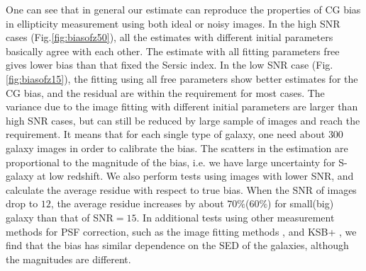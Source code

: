 \documentclass[useAMS,usenatbib]{mn2e}
\begin{document}
One can see that in general our estimate can reproduce the properties
of CG bias in ellipticity measurement using both ideal or noisy
images.  In the high SNR cases (Fig.\ref{fig:biasofz50}), all the
estimates with different initial parameters basically agree with each
other. The estimate with all fitting parameters free gives lower bias
than that fixed the Sersic index. In the low SNR case
(Fig.\ref{fig:biasofz15}), the fitting using all free parameters show
better estimates for the CG bias, and the residual are within the
requirement for most cases. The variance due to the image fitting with
different initial parameters are larger than high SNR cases, but can
still be reduced by large sample of images and reach the requirement.
It means that for each single type of galaxy, one need about $300$
galaxy images in order to calibrate the bias. The scatters in the
estimation are proportional to the magnitude of the bias, i.e. we have
large uncertainty for S-galaxy at low redshift. We also perform tests
using images with lower SNR, and calculate the average residue with
respect to true bias. When the SNR of images drop to $12$, the average
residue increases by about $70\%$($60\%$) for small(big) galaxy than
that of SNR$=15$.
In additional tests using other measurement methods for PSF
correction, such as the image fitting methods
\citep[e.g.][]{2007MNRAS.382..315M,2008MNRAS.390..149K,2013MNRAS.429.2858M},
and KSB+ \citep[e.g.][]{1998ApJ...504..636H,2006MNRAS.368.1323H}, we
find that the bias has similar dependence on the SED of the galaxies,
although the magnitudes are different.
\end{document}
